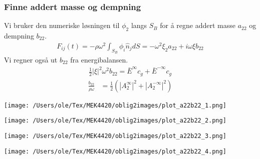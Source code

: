 \documentclass{beamer}
\begin{document}
\begin{frame}
\frametitle{Finne addert masse og dempning}
Vi bruker den numeriske løsningen til $\phi_2$ langs $S_B$ for å regne addert masse $a_{22}$ og dempning $b_{22}$. 
\begin{align}
F_{ij}(t) = - \rho \omega^2 \int_{S_B} \phi_i \hat{n}_j dS = - \omega^2 {\xi}_2 a_{22} + i \omega {\xi}b_{22}
\end{align}
Vi regner også ut $b_{22}$ fra energibalansen. 
\begin{align}
	\frac{1}{2} |\xi|^2 \omega^2 b_{22} =  {\bar{E}^{\infty} c_g + \bar{E}^{-\infty} c_g }
\end{align}
\begin{align}
	\frac{b_{22}}{\rho \omega} &=    \frac{1}{2}  ({| A_2^{\infty} |}^2 +  {| A_2^{-\infty}|}^2)
\end{align}
\end{frame}

\begin{frame}
\begin{minipage}[t]{0.45\linewidth}
    \texttt{[image: /Users/ole/Tex/MEK4420/oblig2images/plot\_a22b22\_1.png]}
    \label{fig:a22_1}
\end{minipage}
\hspace{0.05\linewidth}
\begin{minipage}[t]{0.45\linewidth}
    \texttt{[image: /Users/ole/Tex/MEK4420/oblig2images/plot\_a22b22\_2.png]}
    \label{fig:a22_2}
\end{minipage}
\begin{minipage}[t]{0.45\linewidth}
    \texttt{[image: /Users/ole/Tex/MEK4420/oblig2images/plot\_a22b22\_3.png]}
    \label{fig:a22_3}
\end{minipage}
\hspace{0.05\linewidth}
\begin{minipage}[t]{0.45\linewidth}
    \texttt{[image: /Users/ole/Tex/MEK4420/oblig2images/plot\_a22b22\_4.png]}
    \label{fig:a22_4}
\end{minipage} 
\end{frame}
\end{document}
